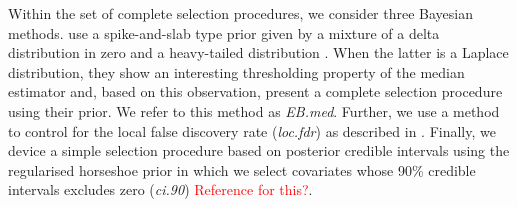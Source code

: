 \documentclass[american,]{article}
\theoremstyle{definition}
\newcommand{\note}[1]{\textcolor{red}{#1}}
\begin{document}

Within the set of complete selection procedures, we consider three
Bayesian methods.  \cite{johnstone2004needles} use a spike-and-slab
type prior given by a mixture of a delta distribution in zero and a
heavy-tailed distribution \cite[see
also][]{paper:spike_slab_mitchell}. When the latter is a Laplace
distribution, they show an interesting thresholding property of the
median estimator and, based on this observation, present a complete
selection procedure using their prior. We refer to this method as
\emph{EB.med}. Further, we use a method to control for the local false
discovery rate (\emph{loc.fdr}) as described in \cite{paper:efron,
  efron2012large}. Finally, we device a simple selection procedure
based on posterior credible intervals using the regularised horseshoe
prior in which we select covariates whose 90\% credible intervals
excludes zero (\emph{ci.90}) \note{Reference for this?}.
\end{document}
